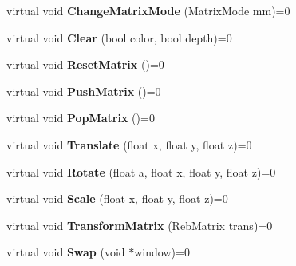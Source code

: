 \begin{DoxyCompactItemize}
\item 
virtual void {\bfseries Change\+Matrix\+Mode} (Matrix\+Mode mm)=0\hypertarget{class_i_render_device_a00f9c54c3e86e413663b45b010ef5b87}{}\label{class_i_render_device_a00f9c54c3e86e413663b45b010ef5b87}

\item 
virtual void {\bfseries Clear} (bool color, bool depth)=0\hypertarget{class_i_render_device_a50f59a65c22dfb30cfd954702ef24bb5}{}\label{class_i_render_device_a50f59a65c22dfb30cfd954702ef24bb5}

\item 
virtual void {\bfseries Reset\+Matrix} ()=0\hypertarget{class_i_render_device_a0724dee30e67b687fdc8e6f2af76a55f}{}\label{class_i_render_device_a0724dee30e67b687fdc8e6f2af76a55f}

\item 
virtual void {\bfseries Push\+Matrix} ()=0\hypertarget{class_i_render_device_a6fe6908f4b6393a425749ec2d8224f26}{}\label{class_i_render_device_a6fe6908f4b6393a425749ec2d8224f26}

\item 
virtual void {\bfseries Pop\+Matrix} ()=0\hypertarget{class_i_render_device_ae10c0040ab8b874ff5fea54d7a0369e4}{}\label{class_i_render_device_ae10c0040ab8b874ff5fea54d7a0369e4}

\item 
virtual void {\bfseries Translate} (float x, float y, float z)=0\hypertarget{class_i_render_device_acc5adaf190557932ed93fd960c53a363}{}\label{class_i_render_device_acc5adaf190557932ed93fd960c53a363}

\item 
virtual void {\bfseries Rotate} (float a, float x, float y, float z)=0\hypertarget{class_i_render_device_a25c9385f2e5cb932d3f35a332f771edc}{}\label{class_i_render_device_a25c9385f2e5cb932d3f35a332f771edc}

\item 
virtual void {\bfseries Scale} (float x, float y, float z)=0\hypertarget{class_i_render_device_ad09e1ba5092cffd925d1ce724a308b49}{}\label{class_i_render_device_ad09e1ba5092cffd925d1ce724a308b49}

\item 
virtual void {\bfseries Transform\+Matrix} (Reb\+Matrix trans)=0\hypertarget{class_i_render_device_af7799d192560bbf4e87b118c27fa6f10}{}\label{class_i_render_device_af7799d192560bbf4e87b118c27fa6f10}

\item 
virtual void {\bfseries Swap} (void $\ast$window)=0\hypertarget{class_i_render_device_ab94977a2fd35735da1d303a96f39024c}{}\label{class_i_render_device_ab94977a2fd35735da1d303a96f39024c}


\end{DoxyCompactItemize}

